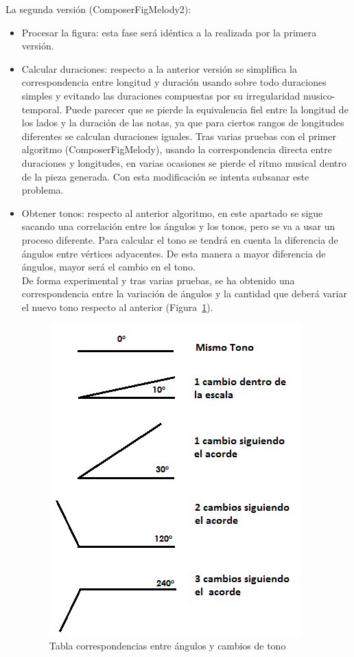 La segunda versión (ComposerFigMelody2):

\begin{itemize}
	\item Procesar la figura: esta fase será idéntica a la realizada por la primera versión.

	\item Calcular duraciones: respecto a la anterior versión se simplifica la correspondencia entre longitud y duración usando sobre todo duraciones simples y evitando las duraciones compuestas por su irregularidad musico-temporal. Puede parecer que se pierde la equivalencia fiel entre la longitud de los lados y la duración de las notas, ya que para ciertos rangos de longitudes diferentes se calculan duraciones iguales. Tras varias pruebas con el primer algoritmo (ComposerFigMelody), usando la correspondencia directa entre duraciones y longitudes, en varias ocasiones se pierde el ritmo musical dentro de la pieza generada. Con esta modificación se intenta subsanar este problema.

	\item Obtener tonos: respecto al anterior algoritmo, en este apartado se sigue sacando una correlación entre los ángulos y los tonos, pero se va a usar un proceso diferente. Para calcular el tono se tendrá en cuenta la diferencia de ángulos entre vértices adyacentes. De esta manera a mayor diferencia de ángulos, mayor será el cambio en el tono. \\
De forma experimental y tras varias pruebas, se ha obtenido una correspondencia entre la variación de ángulos y la cantidad que deberá variar el nuevo tono respecto al anterior (Figura~\ref{fig:Figura3Voz1}). 

		\begin{figure}[!htbp]
		\centering
		\hspace*{0.0in}
		\includegraphics[scale=0.75]{graphics/tabla-corresp-Tono-Angulo.png}
		\caption{Tabla correspondencias entre ángulos y cambios de tono}
		\label{fig:Figura3Voz1}
		\end{figure}


\end{itemize}
